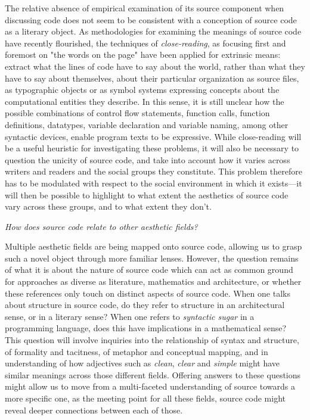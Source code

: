 The relative absence of empirical examination of its source component when discussing code does not seem to be consistent with a conception of source code as a literary object. As methodologies for examining the meanings of source code have recently flourished, the techniques of \emph{close-reading}, as focusing first and foremost on "the words on the page"\cite{richards_practical_1930} have been applied for extrinsic means: extract what the lines of code have to say about the world, rather than what they have to say about themselves, about their particular organization as source files, as typographic objects or as symbol systems expressing concepts about the computational entities they describe. In this sense, it is still unclear how the possible combinations of control flow statements, function calls, function definitions, datatypes, variable declaration and variable naming, among other syntactic devices, enable program texts to be expressive. While close-reading will be a useful heuristic for investigating these problems, it will also be necessary to question the unicity of source code, and take into account how it varies across writers and readers and the social groups they constitute. This problem therefore has to be modulated with respect to the social environment in which it exists—it will then be possible to highlight to what extent the aesthetics of source code vary across these groups, and to what extent they don't.

\vspace*{1\baselineskip}

\emph{How does source code relate to other aesthetic fields?}

Multiple aesthetic fields are being mapped onto source code, allowing us to grasp such a novel object through more familiar lenses. However, the question remains of what it is about the nature of source code which can act as common ground for approaches as diverse as literature, mathematics and architecture, or whether these references only touch on distinct aspects of source code. When one talks about structure in source code, do they refer to structure in an architectural sense, or in a literary sense? When one refers to \emph{syntactic sugar} in a programming language, does this have implications in a mathematical sense? This question will involve inquiries into the relationship of syntax and structure, of formality and tacitness,  of metaphor and conceptual mapping, and in understanding of how adjectives such as \emph{clean}, \emph{clear} and \emph{simple} might have similar meanings across those different fields. Offering answers to these questions might allow us to move from a multi-faceted understanding of source towards a more specific one, as the meeting point for all these fields, source code might reveal deeper connections between each of those.


